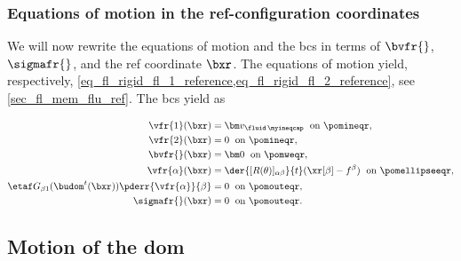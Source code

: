 \subsubsection{Equations of motion in the \acl{ref}-configuration coordinates}\label{sec_rigid_body_fl_ref}


We will now rewrite the equations of motion and the \acp{bc}   in terms of $\bvfr{}$, $\sigmafr{}$, and the \ac{ref} coordinate $\bxr$. The equations of motion \crefs{\eqsbfluc} yield, respectively, \cref{eq_fl_rigid_fl_1_reference,eq_fl_rigid_fl_2_reference}, see \cref{sec_fl_mem_flu_ref}.
The \acp{bc}   yield as

\begin{align}
        \label{bc_fl_rigid_1_reference}
        \vfr{1}(\bxr)                                                  & =  \vfin \; \text{ on } \pomineqr,                                                                      \\
        \label{bc_fl_rigid_2_reference}
        \vfr{2}      (\bxr)                                            & =  0 \; \text{ on } \pomineqr ,                                                                         \\
        \label{bc_fl_rigid_3_reference}
        {\bvfr{}} (\bxr)                                               & = {\bm 0} \; \text{ on } \pomweqr ,                                                                     \\
        \label{bc_fl_rigid_4_reference}
        \vfr{\alpha}(\bxr)                                             & = \der{[R(\theta)]_{\alpha \beta} }{t} (\xr[\beta] - \focalpoint^\beta) \; \text{ on } \pomellipseeqr , \\
        \label{bc_fl_rigid_5_reference}
        \etaf G_{\beta 1}(\budom^t(\bxr)) \pderr{ \vfr{\alpha}}{\beta} & = 0  \; \text{ on } \pomouteqr ,                                                                        \\
        \label{bc_fl_rigid_6_reference}
        \sigmafr{} (\bxr)                                              & = 0 \; \text{ on } \pomouteqr.
\end{align}



\subsection{Motion of the \acl{dom}}
\label{sec_eq_fluid_domain}


